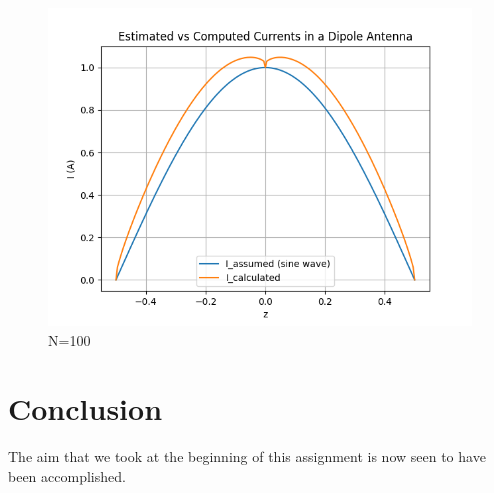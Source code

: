 \documentclass[11pt, a4paper]{article}
\begin{document}
\begin{figure}[!tbh]
   	\centering
  \includegraphics[scale=0.5]{f2.png} 
    \caption{N=100} 	
\end{figure}  

\section{Conclusion}
The aim that we took at the beginning of this assignment is now seen to have been accomplished. 
\end{document}
